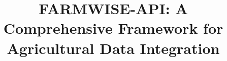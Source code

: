 \documentclass[preprint,12pt,authoryear]{elsarticle}
\begin{document}
\begin{frontmatter}



\title{FARMWISE-API: A Comprehensive Framework for Agricultural Data Integration} %



\end{frontmatter}
\end{document}
